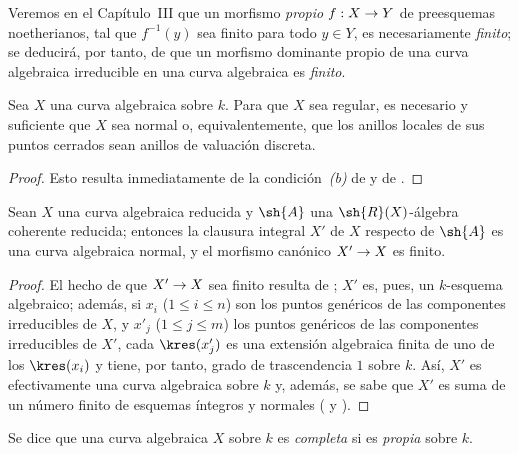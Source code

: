\documentclass[oneside,10pt]{amsart}
\makeatletter
\renewcommand{\leq}{\leqslant}
\newcommand{\ega@arrow}[2]{\mathchoice{#1}{#2}{#2}{#2}}
\renewcommand{\to}{\ega@arrow{\longrightarrow}{\rightarrow}}
\let\EGAOriginalLabel\label
\renewcommand{\label}[1]{\phantomsection\EGAOriginalLabel{#1}}
\makeatother
\begin{document}
Veremos en el Capítulo~III que un morfismo \emph{propio} $f:X\to Y$ de preesquemas noetherianos, tal que $f^{-1}(y)$ sea finito para todo $y\in Y$, es necesariamente \emph{finito};
se deducirá, por tanto, de  que un morfismo dominante propio de una curva algebraica irreducible en una curva algebraica es \emph{finito}.

\begin{corollary}[7.4.5]
\label{II.7.4.5}
Sea $X$ una curva algebraica sobre $k$.
Para que $X$ sea regular, es necesario y suficiente que $X$ sea normal o, equivalentemente, que los anillos locales de sus puntos cerrados sean anillos de valuación discreta.
\end{corollary}

\begin{proof}
Esto resulta inmediatamente de la condición~\emph{(b)} de  y de .
\end{proof}

\begin{corollary}[7.4.6]
\label{II.7.4.6}
Sean $X$ una curva algebraica reducida y $\sh{A}$ una $\sh{R}(X)$-álgebra coherente reducida;
entonces la clausura integral $X'$ de $X$ respecto de $\sh{A}$  es una curva algebraica normal, y el morfismo canónico $X'\to X$ es finito.
\end{corollary}

\begin{proof}
El hecho de que $X'\to X$ sea finito resulta de ;
$X'$ es, pues, un $k$-esquema algebraico;
además, si $x_i$ ($1\leq i\leq n$) son los puntos genéricos de las componentes irreducibles de $X$, y $x'_j$ ($1\leq j\leq m$) los puntos genéricos de las componentes irreducibles de $X'$, cada $\kres(x'_j)$ es una extensión algebraica finita de uno de los $\kres(x_i)$  y tiene, por tanto, grado de trascendencia $1$ sobre $k$.
Así, $X'$ es efectivamente una curva algebraica sobre $k$ y, además, se sabe que $X'$ es suma de un número finito de esquemas íntegros y normales ( y ).
\end{proof}

\begin{env}[7.4.7]
\label{II.7.4.7}
Se dice que una curva algebraica $X$ sobre $k$ es \emph{completa} si es \emph{propia} sobre $k$.
\end{env}
\end{document}
